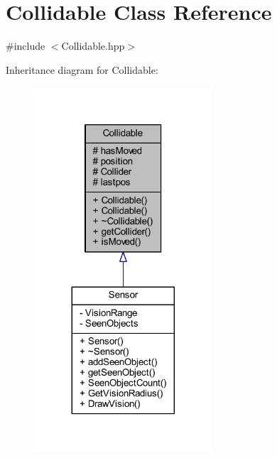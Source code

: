 \hypertarget{class_collidable}{\section{Collidable Class Reference}
\label{class_collidable}
}


{\ttfamily \#include $<$Collidable.\-hpp$>$}



Inheritance diagram for Collidable\-:
\nopagebreak
\begin{figure}[H]
\begin{center}
\leavevmode
\includegraphics[width=188pt]{class_collidable__inherit__graph}
\end{center}
\end{figure}



